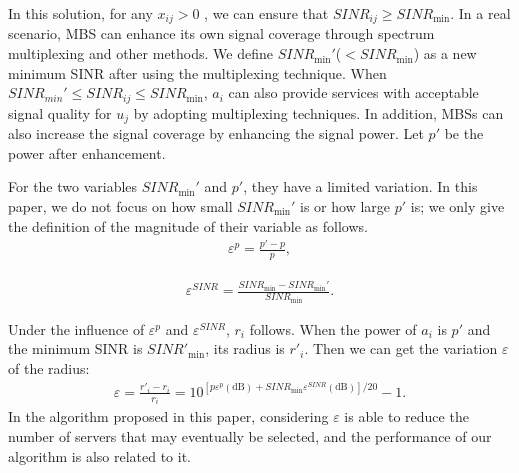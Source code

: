 \documentclass[journal]{IEEEtran}
\begin{document}
In this solution, for any $x_{ij}>0$ , we can ensure that $SINR_{ij}\ge SINR_{\min}$. In a real scenario, MBS can enhance its own signal coverage through spectrum multiplexing and other methods. We define $SINR_{\min}'$($<SINR_{\min}$) as a new minimum SINR after using the multiplexing technique. When $SINR_{min}' \le SINR_{ij} \le SINR_{\min}$, $a_i$ can also provide services with acceptable signal quality for $u_j$ by adopting multiplexing techniques. In addition, MBSs can also increase the signal coverage by enhancing the signal power. Let $p'$ be the power after enhancement.


For the two variables $SINR_{\min}'$ and $p'$, they have a limited variation. In this paper, we do not focus on how small $SINR_{\min}'$ is or how large $p'$ is; we only give the definition of the magnitude of their variable as follows.
\begin{eqnarray}
	{\varepsilon ^p} = \frac{{{p'} - {p}}}{{{p}}},
\end{eqnarray}


\begin{eqnarray}
	{\varepsilon ^{SINR}} = \frac{{SINR_{\min}} - SINR_{\min}'}{{SIN{R_{\min }}}}.
\end{eqnarray}





Under the influence of $\varepsilon^p$ and $\varepsilon^{SINR}$, $r_i$ follows. When the power of $a_i$ is $p'$ and the minimum SINR is $SINR'_{\min}$, its radius is $r'_i$. Then we can get the variation $\varepsilon$ of the radius:
\begin{eqnarray}
	\label{eq9}
	\varepsilon = \frac{r'_i-r_i}{r_i} = 10^{\left[p\varepsilon^p({\text{dB}}) + SINR_{\min}\varepsilon^{SINR}({\text{dB}})\right]/{20}} - 1.
\end{eqnarray}
In the algorithm proposed in this paper, considering $\varepsilon$ is able to reduce the number of servers that may eventually be selected, and the performance of our algorithm is also related to it.
\end{document}

